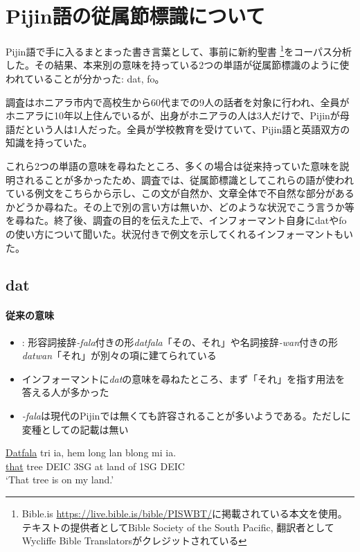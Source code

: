 \documentclass[11pt,a4paper]{jsarticle}
\begin{document}
\section{Pijin語の従属節標識について}
Pijin語で手に入るまとまった書き言葉として、事前に新約聖書 \footnote{Bible.is \url{https://live.bible.is/bible/PISWBT/}に掲載されている本文を使用。テキストの提供者としてBible Society of the South Pacific, 翻訳者としてWycliffe Bible Translatorsがクレジットされている}をコーパス分析した。その結果、本来別の意味を持っている2つの単語が従属節標識のように使われていることが分かった: dat, fo。

調査はホニアラ市内で高校生から60代までの9人の話者を対象に行われ、全員がホニアラに10年以上住んでいるが、出身がホニアラの人は3人だけで、Pijinが母語だという人は1人だった。全員が学校教育を受けていて、Pijin語と英語双方の知識を持っていた。

これら2つの単語の意味を尋ねたところ、多くの場合は従来持っていた意味を説明されることが多かったため、調査では、従属節標識としてこれらの語が使われている例文をこちらから示し、この文が自然か、文章全体で不自然な部分があるかどうか尋ねた。その上で別の言い方は無いか、どのような状況でこう言うか等を尋ねた。終了後、調査の目的を伝えた上で、インフォーマント自身にdatやfoの使い方について聞いた。状況付きで例文を示してくれるインフォーマントもいた。

\subsection{dat}
\paragraph{従来の意味}
\begin{itemize}
  \item \cite{dictionary}: 形容詞接辞\textit{-fala}付きの形\textit{datfala}「その、それ」や名詞接辞\textit{-wan}付きの形\textit{datwan}「それ」が別々の項に建てられている
  \item インフォーマントに\textit{dat}の意味を尋ねたところ、まず「それ」を指す用法を答える人が多かった
  \item \textit{-fala}は現代のPijinでは無くても許容されることが多いようである。ただし\cite{dictionary}に変種としての記載は無い
\end{itemize}
\begin{exe}
\ex
\gll \underline{Datfala} tri ia, hem long lan blong mi ia.\\
\underline{that} tree DEIC 3SG at land of 1SG DEIC\\
\glt `That tree is on my land.'
\end{exe}
\end{document}
